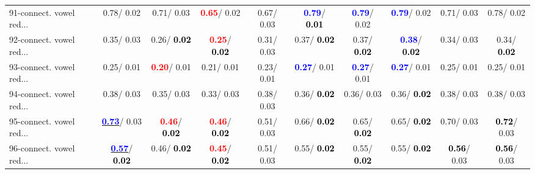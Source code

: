 \begin{table}[h]
\begin{center}
{\begin{tabular}{lc|c|c|c|c|c|c|c|c}
91-connect. vowel red... &   0.78/  0.02 &   0.71/  0.03 & \textcolor{red}{\textbf{  0.65}}/  0.02 &   0.67/  0.03 & \textcolor{blue}{\textbf{  0.79}}/\textcolor{black}{\textbf{  0.01}} & \textcolor{blue}{\textbf{  0.79}}/  0.02 & \textcolor{blue}{\textbf{  0.79}}/  0.02 &   0.71/  0.03 &   0.78/  0.02 \\
92-connect. vowel red... &   0.35/  0.03 &   0.26/\textcolor{black}{\textbf{  0.02}} & \textcolor{red}{\textbf{  0.25}}/\textcolor{black}{\textbf{  0.02}} &   0.31/  0.03 &   0.37/\textcolor{black}{\textbf{  0.02}} &   0.37/\textcolor{black}{\textbf{  0.02}} & \textcolor{blue}{\textbf{  0.38}}/\textcolor{black}{\textbf{  0.02}} &   0.34/  0.03 &   0.34/\textcolor{black}{\textbf{  0.02}} \\ \hline
93-connect. vowel red... &   0.25/  0.01 & \textcolor{red}{\textbf{  0.20}}/  0.01 &   0.21/  0.01 &   0.23/  0.01 & \textcolor{blue}{\textbf{  0.27}}/  0.01 & \textcolor{blue}{\textbf{  0.27}}/  0.01 & \textcolor{blue}{\textbf{  0.27}}/  0.01 &   0.25/  0.01 &   0.25/  0.01 \\
94-connect. vowel red... &   0.38/  0.03 &   0.35/  0.03 &   0.33/  0.03 &   0.38/  0.03 &   0.36/\textcolor{black}{\textbf{  0.02}} &   0.36/  0.03 &   0.36/\textcolor{black}{\textbf{  0.02}} &   0.38/  0.03 &   0.38/  0.03 \\
95-connect. vowel red... & \underline{\textcolor{blue}{\textbf{  0.73}}}/  0.03 & \textcolor{red}{\textbf{  0.46}}/\textcolor{black}{\textbf{  0.02}} & \textcolor{red}{\textbf{  0.46}}/\textcolor{black}{\textbf{  0.02}} &   0.51/  0.03 &   0.66/\textcolor{black}{\textbf{  0.02}} &   0.65/\textcolor{black}{\textbf{  0.02}} &   0.65/\textcolor{black}{\textbf{  0.02}} &   0.70/  0.03 & \textcolor{black}{\textbf{  0.72}}/  0.03 \\
96-connect. vowel red... & \underline{\textcolor{blue}{\textbf{  0.57}}}/\textcolor{black}{\textbf{  0.02}} &   0.46/\textcolor{black}{\textbf{  0.02}} & \textcolor{red}{\textbf{  0.45}}/\textcolor{black}{\textbf{  0.02}} &   0.51/  0.03 &   0.55/\textcolor{black}{\textbf{  0.02}} &   0.55/\textcolor{black}{\textbf{  0.02}} &   0.55/\textcolor{black}{\textbf{  0.02}} & \textcolor{black}{\textbf{  0.56}}/  0.03 & \textcolor{black}{\textbf{  0.56}}/  0.03 \\\end{tabular}}\label{stratsALCKappa2Allallb}
\end{center}
\end{table}
